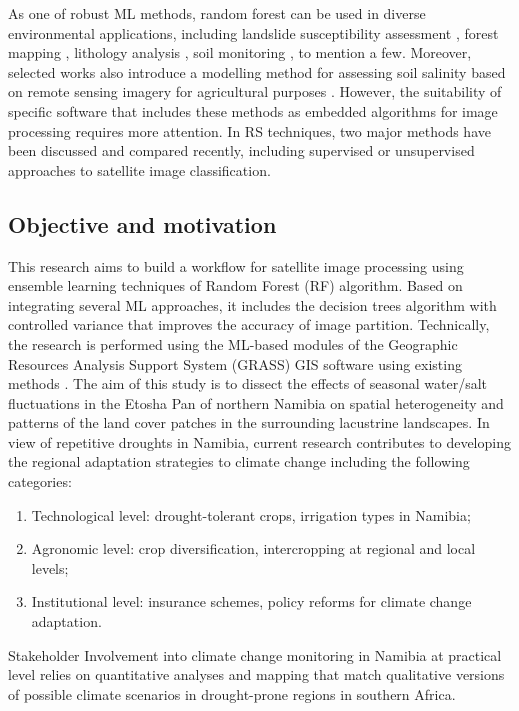 \documentclass[climate,article,submit,pdftex,moreauthors]{Definitions/mdpi}
\begin{document}
{{As one of robust ML methods, random forest can be used in diverse environmental applications, including landslide susceptibility assessment} \cite{rs16193663,land14040839,land14040722}, {forest mapping} \cite{app15073977}, {lithology analysis} \cite{rs17071314}, {soil monitoring} \cite{nitrogen6020023}, {to mention a few. Moreover, selected works also introduce a modelling method for assessing soil salinity based on remote sensing imagery for agricultural purposes} \cite{agriculture15030323,agriculture15030339,agronomy15040963}. However, the suitability of specific software that includes these methods as embedded algorithms for image processing requires more attention. In RS techniques, two major methods have been discussed and compared recently, including supervised \cite{GOLDBLATT2018253,MARTINEZMONTOYA2010978,INZANA200359} or unsupervised \cite{SHIH199497,LU2023116898,Lemenkova202322} approaches to satellite image classification.

\subsection{Objective and motivation}

This research aims to build a workflow for satellite image processing using ensemble learning techniques of Random Forest (RF) algorithm. Based on integrating several ML approaches, it includes the decision trees algorithm with controlled variance that improves the accuracy of image partition. Technically, the research is performed using the ML-based modules of the Geographic Resources Analysis Support System (GRASS) GIS software using existing methods \cite{lemenkova2025automation}. The aim of this study is to dissect the effects of seasonal water/salt fluctuations in the Etosha Pan of northern Namibia on spatial heterogeneity and patterns of the land cover patches in the surrounding lacustrine landscapes. {In view of repetitive droughts in Namibia, current research contributes to developing the regional adaptation strategies to climate change including the following categories}: 
\begin{enumerate}
	\item {Technological level: drought-tolerant crops, irrigation types in Namibia;}
	\item {Agronomic level: crop diversification, intercropping at regional and local levels;}
	\item {Institutional level: insurance schemes, policy reforms for climate change adaptation.}
\end{enumerate}
{Stakeholder Involvement into climate change monitoring in Namibia at practical level relies on quantitative analyses and mapping that match qualitative versions of possible climate scenarios in drought-prone regions in southern Africa.}

}
\end{document}
